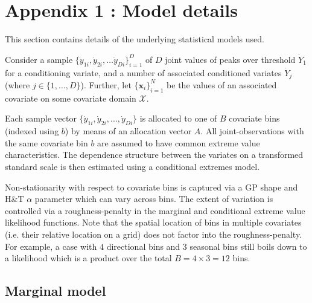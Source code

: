 
\section{Appendix 1 : Model details} \label{App1}

%
This section contains details of the underlying statistical models used. 

 Consider a sample $\{ \dot{y}_{1i},\dot{y}_{2i},\ldots \dot{y}_{Di}\}_{i=1}^{D}$ of $D$ joint values of peaks over threshold $\dot{Y}_1$ for a conditioning variate, and a number of associated conditioned variates $\dot{Y}_j$ (where $j \in \{1,\ldots,D\}$). Further, let $\{\boldsymbol{x}_i\}_{i=1}^{N}$ be the values of an associated covariate on some covariate domain $\mathcal{X}$.
 
 Each sample vector $\{ \dot{y}_{1i},\dot{y}_{2i},\ldots,\dot{y}_{Di}\}$ is allocated to one of $B$ covariate bins (indexed using $b$) by means of an allocation vector $A$.  All joint-observations with the same covariate bin $b$ are assumed to have common extreme value characteristics.  The dependence structure between the variates on a transformed standard scale is then estimated using a conditional extremes model.
 
 Non-stationarity with respect to covariate bins is captured via a GP shape and H\&T $\alpha$ parameter which can vary across bins. The extent of variation is controlled via a roughness-penalty in the marginal and conditional extreme value likelihood functions. Note that the spatial location of bins in multiple covariates (i.e. their relative location on a grid) does not factor into the roughness-penalty. For example, a case with $4$ directional bins and $3$ seasonal bins still boils down to a likelihood which is a product over the total $B = 4\times 3 = 12$ bins. 
%
\subsection{Marginal model}


